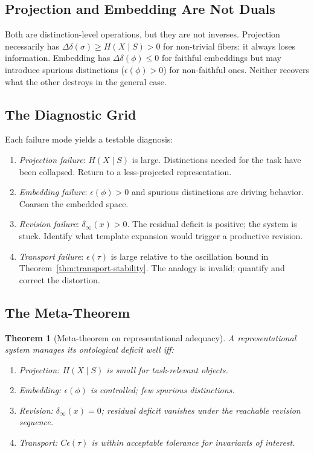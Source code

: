 \documentclass[12pt, a4paper]{article}
\theoremstyle{plain}
\newtheorem{theorem}{Theorem}[section]
\theoremstyle{definition}
\theoremstyle{remark}
\newcommand{\Ddelta}{\Delta\delta}
\newcommand{\eps}{\epsilon}
\begin{document}
\subsection{Projection and Embedding Are Not Duals}

Both are distinction-level operations, but they are not inverses. Projection
necessarily has $\Ddelta(\sigma)\ge H(X\mid S)>0$ for non-trivial fibers:
it always loses information. Embedding has $\Ddelta(\phi)\le 0$ for faithful
embeddings but may introduce spurious distinctions ($\eps(\phi)>0$) for
non-faithful ones. Neither recovers what the other destroys in the general case.

\subsection{The Diagnostic Grid}

Each failure mode yields a testable diagnosis:

\begin{enumerate}[leftmargin=1.8em, label=(\arabic*)]
  \item \emph{Projection failure}: $H(X\mid S)$ is large. Distinctions needed
        for the task have been collapsed. Return to a less-projected representation.
  \item \emph{Embedding failure}: $\eps(\phi)>0$ and spurious distinctions
        are driving behavior. Coarsen the embedded space.
  \item \emph{Revision failure}: $\delta_\infty(x)>0$. The residual deficit
        is positive; the system is stuck. Identify what template expansion
        would trigger a productive revision.
  \item \emph{Transport failure}: $\eps(\tau)$ is large relative to the
        oscillation bound in Theorem~\ref{thm:transport-stability}. The analogy
        is invalid; quantify and correct the distortion.
\end{enumerate}

\subsection{The Meta-Theorem}

\begin{theorem}[Meta-theorem on representational adequacy]
\label{thm:meta}
A representational system manages its ontological deficit well iff:
\begin{enumerate}[label=(\roman*)]
  \item \emph{Projection}: $H(X\mid S)$ is small for task-relevant objects.
  \item \emph{Embedding}: $\eps(\phi)$ is controlled; few spurious distinctions.
  \item \emph{Revision}: $\delta_\infty(x)=0$; residual deficit vanishes under
        the reachable revision sequence.
  \item \emph{Transport}: $C\eps(\tau)$ is within acceptable tolerance for
        invariants of interest.
\end{enumerate}
\end{theorem}
\end{document}

